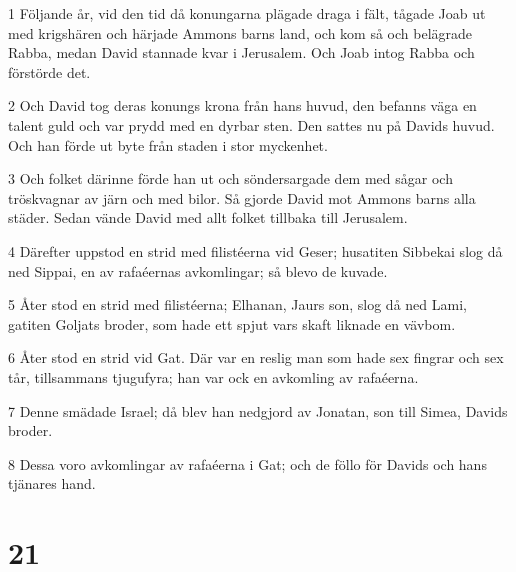 \par 1 Följande år, vid den tid då konungarna plägade draga i fält, tågade Joab ut med krigshären och härjade Ammons barns land, och kom så och belägrade Rabba, medan David stannade kvar i Jerusalem. Och Joab intog Rabba och förstörde det.
\par 2 Och David tog deras konungs krona från hans huvud, den befanns väga en talent guld och var prydd med en dyrbar sten. Den sattes nu på Davids huvud. Och han förde ut byte från staden i stor myckenhet.
\par 3 Och folket därinne förde han ut och söndersargade dem med sågar och tröskvagnar av järn och med bilor. Så gjorde David mot Ammons barns alla städer. Sedan vände David med allt folket tillbaka till Jerusalem.
\par 4 Därefter uppstod en strid med filistéerna vid Geser; husatiten Sibbekai slog då ned Sippai, en av rafaéernas avkomlingar; så blevo de kuvade.
\par 5 Åter stod en strid med filistéerna; Elhanan, Jaurs son, slog då ned Lami, gatiten Goljats broder, som hade ett spjut vars skaft liknade en vävbom.
\par 6 Åter stod en strid vid Gat. Där var en reslig man som hade sex fingrar och sex tår, tillsammans tjugufyra; han var ock en avkomling av rafaéerna.
\par 7 Denne smädade Israel; då blev han nedgjord av Jonatan, son till Simea, Davids broder.
\par 8 Dessa voro avkomlingar av rafaéerna i Gat; och de föllo för Davids och hans tjänares hand.

\chapter{21}


